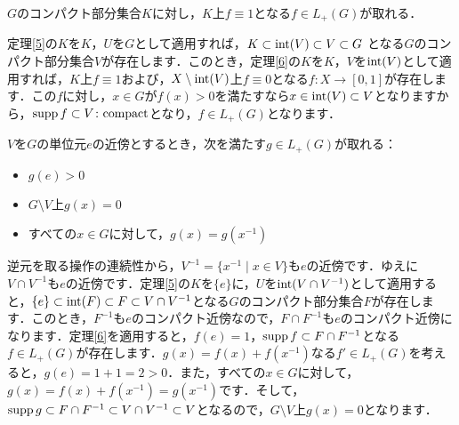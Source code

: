 \begin{ylem}\label{14}
$G$のコンパクト部分集合$K$に対し，$K$上$f \equiv 1$となる$f \in L_{+}(G)$が取れる．
\end{ylem}
\begin{Proof}
定理\ref{5}の$K$を$K$，$U$を$G$として適用すれば，$K \subset \operatorname{int}(V) \subset V \subset G$ となる$G$のコンパクト部分集合$V$が存在します．このとき，定理\ref{6}の$K$を$K$，$V$を$\operatorname{int}(V)$として適用すれば，$K$上$f \equiv 1$および，$X \setminus \operatorname{int}(V)$上$f \equiv 0$となる$f \colon X \to [0, 1]$が存在します．この$f$に対し，$x \in G$が$f(x)>0$を満たすなら$x \in \operatorname{int}(V) \subset V$となりますから，$\operatorname{supp} f \subset V \colon \mathrm{compact}$となり，$f \in L_{+}(G)$となります．
\end{Proof}
\begin{ylem}\label{15}
$V$を$G$の単位元$e$の近傍とするとき，次を満たす$g \in L_{+}(G)$が取れる：
\begin{itemize}
 \item $g(e)>0$
 \item $G \setminus V$上$g(x)=0$
 \item すべての$x \in G$に対して，$g(x)=g(x^{-1})$
\end{itemize}
\end{ylem}
\begin{Proof}
逆元を取る操作の連続性から，$V^{-1}=\{ x^{-1} \mid x \in V \}$も$e$の近傍です．ゆえに$V \cap V^{-1}$も$e$の近傍です．定理\ref{5}の$K$を$\{e\}$に，$U$を$\operatorname{int}(V \cap V^{-1})$として適用すると，$\{e\} \subset \operatorname{int}(F) \subset F \subset V \cap V^{-1}$となる$G$のコンパクト部分集合$F$が存在します．このとき，$F^{-1}$も$e$のコンパクト近傍なので，$F \cap F^{-1}$も$e$のコンパクト近傍になります．定理\ref{6}を適用すると，$f(e)=1$，$\operatorname{supp} f \subset F \cap F^{-1}$となる$f \in L_{+}(G)$が存在します．$g(x)=f(x)+f(x^{-1})$なる$f' \in L_{+}(G)$を考えると，$g(e)=1+1=2>0$．また，すべての$x \in G$に対して，$g(x)=f(x)+f(x^{-1})=g(x^{-1})$です．そして，$\operatorname{supp} g \subset F \cap F^{-1} \subset V \cap V^{-1} \subset V$となるので，$G \setminus V$上$g(x)=0$となります．　
\end{Proof}

